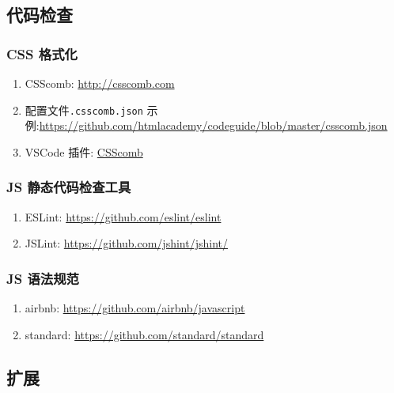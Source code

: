 \subsection{代码检查}\label{ux4ee3ux7801ux68c0ux67e5}

\subsubsection{CSS 格式化}\label{css-ux683cux5f0fux5316}

\begin{enumerate}
\def\labelenumi{\arabic{enumi}.}
\tightlist
\item
  CSScomb: \url{http://csscomb.com}
\item
  配置文件\lstinline!.csscomb.json!
  示例:\url{https://github.com/htmlacademy/codeguide/blob/master/csscomb.json}
\item
  VSCode 插件:
  \href{https://marketplace.visualstudio.com/items?itemName=mrmlnc.vscode-csscomb}{CSScomb}
\end{enumerate}

\subsubsection{JS
静态代码检查工具}\label{js-ux9759ux6001ux4ee3ux7801ux68c0ux67e5ux5de5ux5177}

\begin{enumerate}
\def\labelenumi{\arabic{enumi}.}
\tightlist
\item
  ESLint: \url{https://github.com/eslint/eslint}
\item
  JSLint: \url{https://github.com/jshint/jshint/}
\end{enumerate}

\subsubsection{JS 语法规范}\label{js-ux8bedux6cd5ux89c4ux8303}

\begin{enumerate}
\def\labelenumi{\arabic{enumi}.}
\tightlist
\item
  airbnb: \url{https://github.com/airbnb/javascript}
\item
  standard: \url{https://github.com/standard/standard}
\end{enumerate}

\subsection{扩展}\label{ux6269ux5c55}


